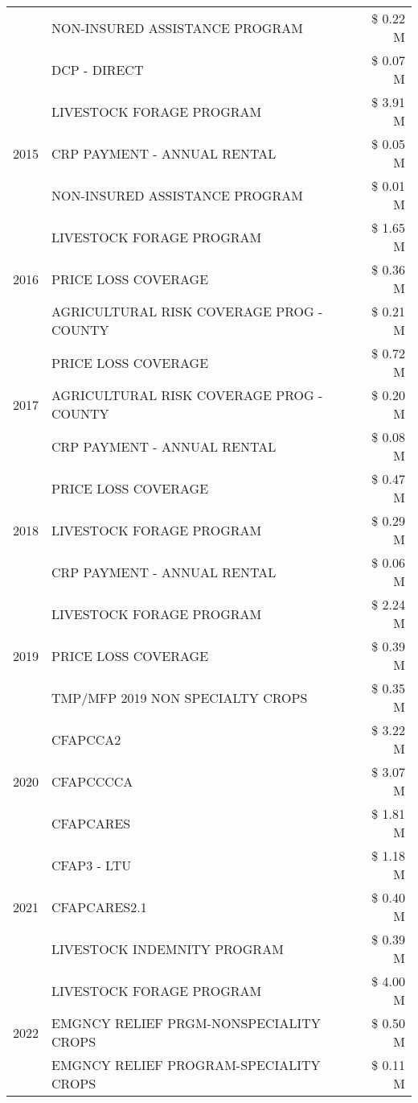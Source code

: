 \begin{tabular}{llr}
 & NON-INSURED ASSISTANCE PROGRAM & \$ 0.22 M \\
 & DCP - DIRECT & \$ 0.07 M \\
\cline{1-3}
\multirow[t]{3}{*}{2015} & LIVESTOCK FORAGE PROGRAM & \$ 3.91 M \\
 & CRP PAYMENT - ANNUAL RENTAL & \$ 0.05 M \\
 & NON-INSURED ASSISTANCE PROGRAM & \$ 0.01 M \\
\cline{1-3}
\multirow[t]{3}{*}{2016} & LIVESTOCK FORAGE PROGRAM & \$ 1.65 M \\
 & PRICE LOSS COVERAGE & \$ 0.36 M \\
 & AGRICULTURAL RISK COVERAGE PROG - COUNTY & \$ 0.21 M \\
\cline{1-3}
\multirow[t]{3}{*}{2017} & PRICE LOSS COVERAGE & \$ 0.72 M \\
 & AGRICULTURAL RISK COVERAGE PROG - COUNTY & \$ 0.20 M \\
 & CRP PAYMENT - ANNUAL RENTAL & \$ 0.08 M \\
\cline{1-3}
\multirow[t]{3}{*}{2018} & PRICE LOSS COVERAGE & \$ 0.47 M \\
 & LIVESTOCK FORAGE PROGRAM & \$ 0.29 M \\
 & CRP PAYMENT - ANNUAL RENTAL & \$ 0.06 M \\
\cline{1-3}
\multirow[t]{3}{*}{2019} & LIVESTOCK FORAGE PROGRAM & \$ 2.24 M \\
 & PRICE LOSS COVERAGE & \$ 0.39 M \\
 & TMP/MFP 2019 NON SPECIALTY CROPS & \$ 0.35 M \\
\cline{1-3}
\multirow[t]{3}{*}{2020} & CFAPCCA2 & \$ 3.22 M \\
 & CFAPCCCCA & \$ 3.07 M \\
 & CFAPCARES & \$ 1.81 M \\
\cline{1-3}
\multirow[t]{3}{*}{2021} & CFAP3 - LTU & \$ 1.18 M \\
 & CFAPCARES2.1 & \$ 0.40 M \\
 & LIVESTOCK INDEMNITY PROGRAM & \$ 0.39 M \\
\cline{1-3}
\multirow[t]{3}{*}{2022} & LIVESTOCK FORAGE PROGRAM & \$ 4.00 M \\
 & EMGNCY RELIEF PRGM-NONSPECIALITY CROPS & \$ 0.50 M \\
 & EMGNCY RELIEF PROGRAM-SPECIALITY CROPS & \$ 0.11 M \\
\cline{1-3}
\bottomrule
\end{tabular}
